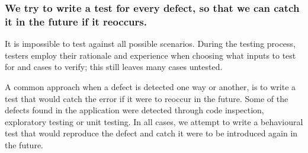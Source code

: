 \subsubsection{We try to write a test for every defect, so that we can catch it in the future if it reoccurs.}
It is impossible to test against all possible scenarios. During the testing process, testers employ their rationale and experience when choosing what inputs to test for and cases to verify; this still leaves many cases untested.
\par
A common approach when a defect is detected one way or another, is to write a test that would catch the error if it were to reoccur in the future. Some of the defects found in the application were detected through code inspection, exploratory testing or unit testing. In all cases, we attempt to write a behavioural test that would reproduce the defect and catch it were to be introduced again in the future. 
